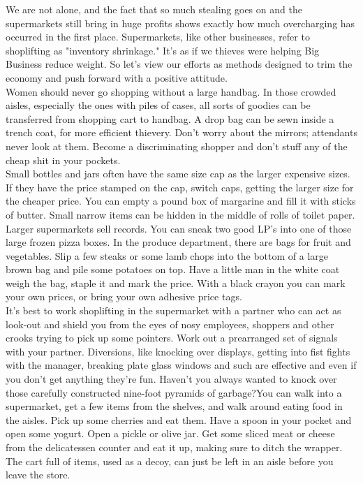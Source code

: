 \documentclass[11pt,twoside,a4paper]{book}
\begin{document}
We are not alone, and the fact that so much stealing goes on and the supermarkets still bring in huge profits shows exactly how much overcharging has occurred in the first place. Supermarkets, like other businesses, refer to shoplifting as "inventory shrinkage." It's as if we thieves were helping Big Business reduce weight. So let's view our efforts as methods designed to trim the economy and push forward with a positive attitude.~\\

Women should never go shopping without a large handbag. In those crowded aisles, especially the ones with piles of cases, all sorts of goodies can be transferred from shopping cart to handbag. A drop bag can be sewn inside a trench coat, for more efficient thievery. Don't worry about the mirrors; attendants never look at them.  Become a discriminating shopper and don't stuff any of the cheap shit in your pockets.~\\

Small bottles and jars often have the same size cap as the larger expensive sizes. If they have the price stamped on the cap, switch caps, getting the larger size for the cheaper price. You can empty a pound box of margarine and fill it with sticks of butter. Small narrow items can be hidden in the middle of rolls of toilet paper. Larger supermarkets sell records. You can sneak two good LP's into one of those large frozen pizza boxes. In the produce department, there are bags for fruit and vegetables. Slip a few steaks or some lamb chops into the bottom of a large brown bag and pile some potatoes on top. Have a little man in the white coat weigh the bag, staple it and mark the price. With a black crayon you can mark your own prices, or bring your own adhesive price tags.~\\

It's best to work shoplifting in the supermarket with a partner who can act as look-out and shield you from the eyes of nosy employees, shoppers and other crooks trying to pick up some pointers. Work out a prearranged set of signals with your partner. Diversions, like knocking over displays, getting into fist fights with the manager, breaking plate glass windows and such are effective and even if you don't get anything they're fun. Haven't you always wanted to knock over those carefully constructed nine-foot pyramids of garbage?You can walk into a supermarket, get a few items from the shelves, and walk around eating food in the aisles.  Pick up some cherries and eat them.	Have a spoon in your pocket and open some yogurt. Open a pickle or olive jar. Get some sliced meat or cheese from the delicatessen counter and eat it up, making sure to ditch the wrapper. The cart full of items, used as a decoy, can just be left in an aisle before you leave the store.~\\
\end{document}
